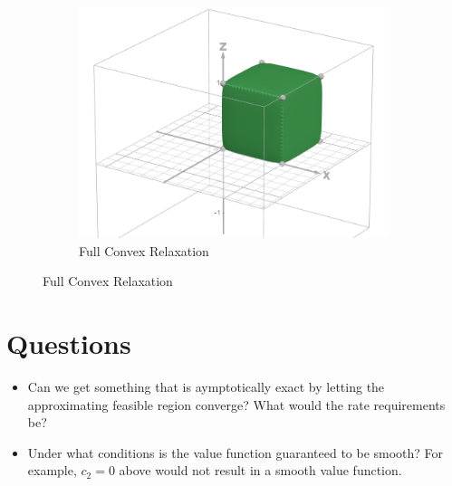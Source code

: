 \documentclass[11pt,a4paper,english]{article} %
\numberwithin{equation}{section}
\numberwithin{figure}{section}
\numberwithin{table}{section}
\theoremstyle{definition}
\theoremstyle{remark}
\begin{document}
\begin{figure}
	\begin{subfigure}{0.5\textwidth}
		\includegraphics[width=\textwidth]{../figures/desmos_dim_3_poly_shape.png}
		\caption{Full Convex Relaxation}
	\end{subfigure}
\end{figure}



\section{Questions}

\begin{itemize}
	\item Can we get something that is aymptotically exact by letting the approximating feasible region converge? What would the rate requirements be?
	\item Under what conditions is the value function guaranteed to be smooth? For example, $c_2 = 0$ above would not result in a smooth value function.
\end{itemize}

% 
% 
\end{document}
